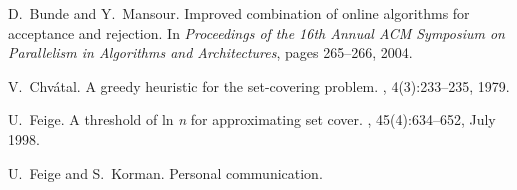 \documentclass{sig-alternate}
\begin{document}
\begin{thebibliography}{10}
\balancecolumns

D.~Bunde and Y.~Mansour.
\newblock Improved combination of online algorithms for acceptance and
  rejection.
\newblock In {\em Proceedings of the 16th Annual {ACM} Symposium on Parallelism
  in Algorithms and Architectures}, pages 265--266, 2004.

V.~Chv\'{a}tal.
\newblock A greedy heuristic for the set-covering problem.
, 4(3):233--235, 1979.

U.~Feige.
\newblock A threshold of ln {\em n} for approximating set cover.
, 45(4):634--652, July 1998.

U.~Feige and S.~Korman.
\newblock Personal communication.

\end{thebibliography}
\end{document}
